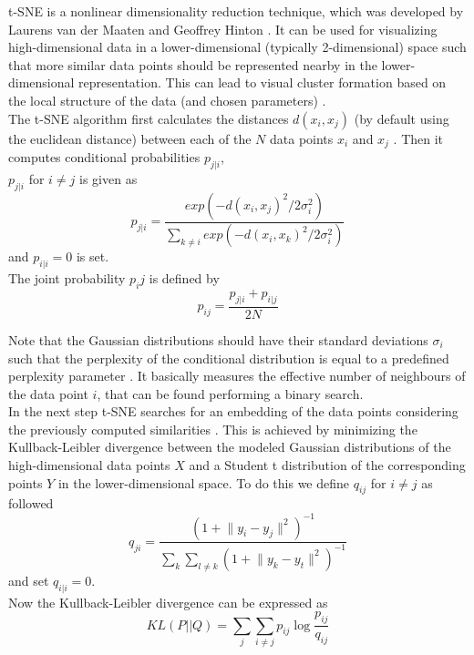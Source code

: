 \marginnote{\textcolor{blue}{Jonas Elpelt}}

t-SNE is a nonlinear dimensionality reduction technique, which was developed by Laurens van der Maaten and Geoffrey Hinton \cite{tsne}. It can be used for visualizing high-dimensional data in a lower-dimensional (typically 2-dimensional) space such that more similar data points should be represented nearby in the lower-dimensional representation. This can lead to visual cluster formation based on the local structure of the data (and chosen parameters) \cite{wattenberg2016how}.  \\
The t-SNE algorithm first calculates the distances $d(x_i, x_j)$ (by default using the euclidean distance) between each of the $N$ data points $x_i$ and $x_j$ \cite{tsne_matlab}. Then it computes conditional probabilities $p_{j|i}$, \cite{tsne} \\
$p_{j|i}$ for $i \neq j$ is given as
\begin{equation}
	p_{j|i} = \frac{exp(-d(x_i, x_j)^2 / 2\sigma_i^2)}{\sum_{k \neq i} exp(-d(x_i, x_k)^2 / 2\sigma_i^2)} 
\end{equation}
and $p_{i|i} = 0$ is set. \\
The joint probability $p_ij$ is defined by 
\begin{equation}
	p_{ij} = \frac{p_{j|i} + p_{i|j}}{2N}
\end{equation}

Note that the Gaussian distributions should have their standard deviations $\sigma_i$ such that the perplexity of the conditional distribution is equal to a predefined perplexity parameter \cite{tsne_matlab}. It basically measures the effective number of neighbours of the data point $i$, that can be found performing a binary search.   \\
In the next step t-SNE searches for an embedding of the data points considering the previously computed similarities \cite{tsne_matlab}. This is achieved by minimizing the Kullback-Leibler divergence between the modeled Gaussian distributions of the high-dimensional data points $X$ and a Student t distribution of the corresponding points $Y$ in the lower-dimensional space. To do this we define $q_{ij}$ for $i \neq j$ as followed 
\begin{equation}
	q_{ji} = \frac{(1 + \lVert y_i - y_j \rVert ^2)^{-1}}{\sum_{k}\sum_{l \neq k} (1 + \lVert y_k - y_t \rVert ^2)^{-1}}
\end{equation}
and set $q_{i|i} = 0$. \\
Now the Kullback-Leibler divergence can be expressed as \\
\begin{equation}
	KL(P||Q) = \sum_{j}\sum_{i \neq j}p_{ij}\log\frac{p_{ij}}{q_{ij}}
\end{equation}

